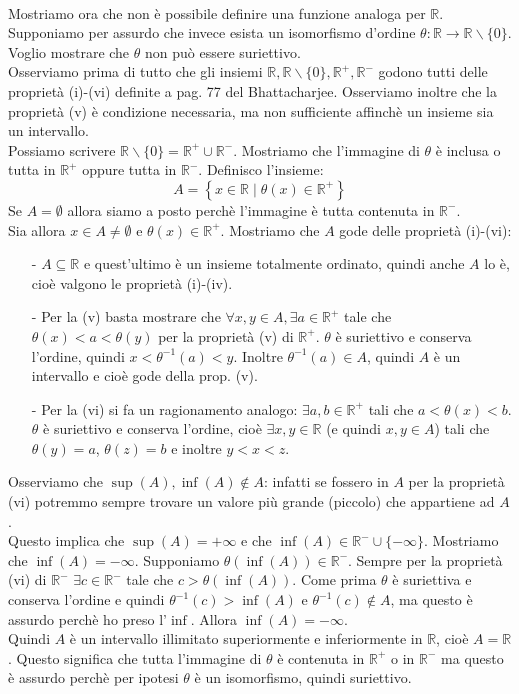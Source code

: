 \documentclass[12pt,a4paper,draft]{article}
\begin{document}
\paragraph{} Mostriamo ora che non è possibile definire una funzione analoga per $\mathbb{R}$. \\ 
Supponiamo per assurdo che invece esista un isomorfismo d'ordine $\theta: \mathbb{R} \rightarrow \mathbb{R} \backslash \{0\}$. Voglio mostrare che $\theta$ non può essere suriettivo. \\
Osserviamo prima di tutto che gli insiemi $\mathbb{R},\mathbb{R}\backslash\{0\},\mathbb{R}^+,\mathbb{R}^-$ godono tutti delle proprietà (i)-(vi) definite a pag. 77 del Bhattacharjee. Osserviamo inoltre che la proprietà (v) è condizione necessaria, ma non sufficiente affinchè un insieme sia un intervallo.\\
Possiamo scrivere $\mathbb{R}\backslash\{0\}=\mathbb{R}^+\cup\mathbb{R}^-$. Mostriamo che l'immagine di $\theta$ è inclusa o tutta in $\mathbb{R}^+$ oppure tutta in $\mathbb{R}^-$.
Definisco l'insieme:
\[A=\left\{x \in \mathbb{R} \mid \theta(x) \in \mathbb{R}^+ \right\}\]
Se $A=\emptyset$ allora siamo a posto perchè l'immagine è tutta contenuta in $\mathbb{R}^-$. \\ Sia allora $x \in A\neq\emptyset$ e $\theta(x) \in \mathbb{R}^+$. Mostriamo che $A$ gode delle proprietà (i)-(vi):
\begin{itemize}
\item[-] $A\subseteq \mathbb{R}$ e quest'ultimo è un insieme totalmente ordinato, quindi anche $A$ lo è, cioè valgono le proprietà (i)-(iv).
\item[-] Per la (v) basta mostrare che $\forall x,y \in A, \exists a \in \mathbb{R}^+$ tale  che $\theta(x)<a<\theta(y)$ per la proprietà (v) di $\mathbb{R}^+$. $\theta$ è suriettivo e conserva l'ordine, quindi $x< \theta^{-1}(a)<y$. Inoltre $\theta^{-1}(a) \in A$, quindi $A$ è un intervallo e cioè gode della prop. (v).
\item[-]Per la (vi) si fa un ragionamento analogo: $\exists a,b \in \mathbb{R}^+$ tali che $a<\theta(x)<b$. $\theta$ è suriettivo e conserva l'ordine, cioè $\exists x,y \in \mathbb{R}$ (e quindi $x,y \in A$) tali che $\theta(y)=a$, $\theta(z)=b$ e inoltre $y<x<z$.
\end{itemize}
Osserviamo che $\sup(A),\inf(A)\notin A$: infatti se fossero in $A$ per la proprietà (vi) potremmo sempre trovare un valore più grande (piccolo) che appartiene ad $A$. \\
Questo implica che $\sup(A)=+\infty $ e che $\inf(A) \in \mathbb{R}^-\cup\{-\infty\}$. Mostriamo che $\inf(A)=-\infty$.
Supponiamo $\theta(\inf(A)) \in \mathbb{R}^-$. Sempre per la proprietà (vi) di $\mathbb{R}^-$ $\exists c \in \mathbb{R}^-$ tale che $c>\theta(\inf(A))$. Come prima $\theta$ è suriettiva e conserva l'ordine e quindi $\theta^{-1}(c)>\inf(A)$ e $\theta^{-1}(c) \notin A$, ma questo è assurdo perchè ho preso l'$\inf$. Allora $\inf(A)=-\infty$. \\
Quindi $A$ è un intervallo illimitato superiormente e inferiormente in $\mathbb{R}$, cioè $A = \mathbb{R}$. Questo significa che tutta l'immagine di $\theta$ è contenuta in $\mathbb{R}^+$ o in $\mathbb{R}^-$ ma questo è assurdo perchè per ipotesi $\theta$ è un isomorfismo, quindi suriettivo.
\end{document}
